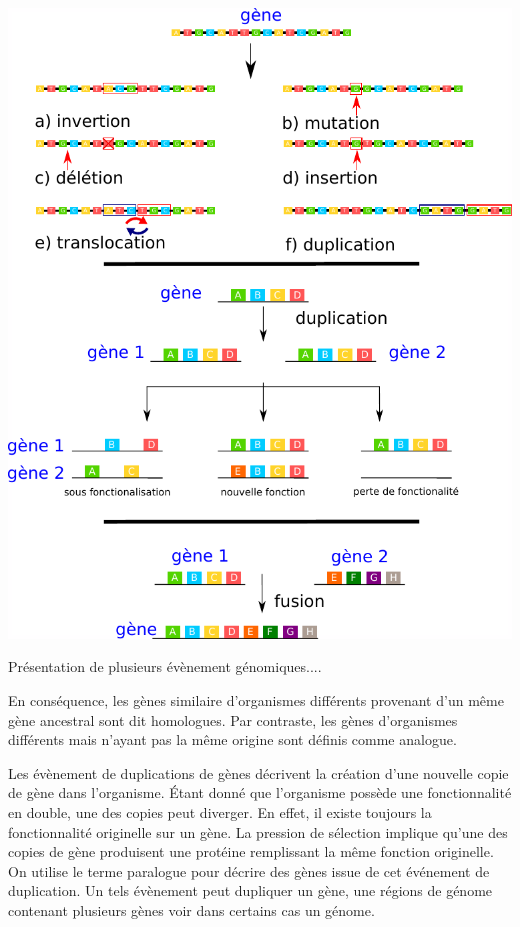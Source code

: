 \begin{refsection}
    \begin{shadedfigure}
        \centering
        \includegraphics[width=\textwidth]{img/gene_indel.pdf}
        \caption{Présentation de plusieurs évènement génomiques....}
        \label{fig:/evenement_mutation}
    \end{shadedfigure}
    
    En conséquence, les gènes similaire d’organismes différents provenant d’un même gène ancestral sont dit homologues. Par contraste, les gènes d’organismes différents mais n’ayant pas la même origine sont définis comme analogue.
    
    Les évènement de duplications de gènes décrivent la création d’une nouvelle copie de gène dans l’organisme. Étant donné que l'organisme possède une fonctionnalité en double, une des copies peut diverger. En effet, il existe toujours la fonctionnalité originelle sur un gène. La pression de sélection implique qu’une des copies de gène produisent une protéine remplissant la même fonction originelle. On utilise le terme paralogue pour décrire des gènes issue de cet événement de duplication. Un tels évènement peut dupliquer un gène, une régions de génome contenant plusieurs gènes  voir dans certains cas un génome.
    

\end{refsection}
